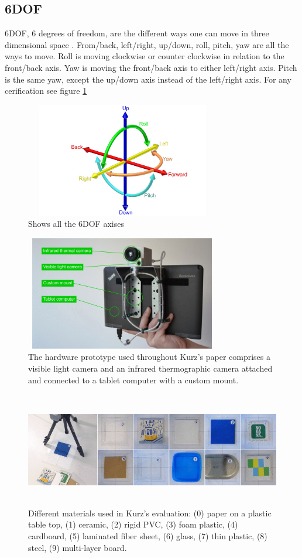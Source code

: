 \documentclass{sig-alternate}
\begin{document}
\subsection{6DOF}
\label{sec:6DOF}
6DOF, 6 degrees of freedom, are the different ways one can move in three dimensional space . From/back, left/right, up/down, roll, pitch, yaw are all the ways to move. Roll is moving clockwise or counter clockwise in relation to the front/back axis. Yaw is moving the front/back axis to either left/right axis. Pitch is the same yaw, except the up/down axis instead of the left/right axis. For any cerification see figure \ref{fig:6DOF}
\begin{figure}
	\includegraphics[width=8.5cm, height=5cm]{6DOF_en}
	\caption{Shows all the 6DOF axises \cite{6DOF}}
	\label{fig:6DOF}
\end{figure} 

\begin{figure}
	\includegraphics[width=8.5cm, height=5cm]{Hardware2}
	\caption{The hardware prototype used throughout Kurz's paper comprises a visible light camera and an infrared thermographic camera attached and connected to a tablet computer with a custom mount. \cite{Thermal}}
	\label{fig:hardware}
\end{figure} 
\begin{figure}
	\includegraphics[width=18cm, height=5cm]{ThermalTesting}
	\caption{Different materials used in Kurz's evaluation: (0) paper on a plastic table top, (1) ceramic, (2) rigid PVC, (3) foam plastic, (4) cardboard, (5) laminated fiber sheet, (6) glass, (7) thin plastic, (8) steel, (9) multi-layer board. \cite{Thermal}}
	\label{fig:ThermalTest}
\end{figure}
\end{document}
